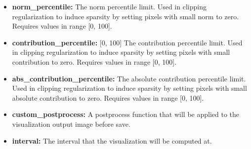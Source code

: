 \begin{itemize}
    \item \textbf{norm\_percentile:} The norm percentile limit. Used in clipping regularization to induce sparsity by setting pixels with small norm to zero. Requires values in range [0, 100].
    \item \textbf{contribution\_percentile:} [0, 100] The contribution percentile limit. Used in clipping regularization to induce sparsity by setting pixels with small contribution to zero. Requires values in range [0, 100].
    \item \textbf{abs\_contribution\_percentile:} The absolute contribution percentile limit. Used in clipping regularization to induce sparsity by setting pixels with small absolute contribution to zero. Requires values in range [0, 100].
    \item \textbf{custom\_postprocess:} A postprocess function that will be applied to the visualization output image before save.
    \item \textbf{interval:} The interval that the visualization will be computed at.
\end{itemize}

\cleardoublepage
